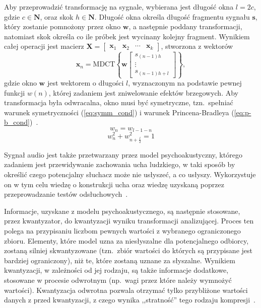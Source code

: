 \documentclass[pl,12pt]{aghdpl}
\begin{document}
Aby przeprowadzić transformację na sygnale, wybierana jest długość okna $l =
2c$, gdzie $c \in \bm N$, oraz skok $h \in \bm N$. Długość okna określa długość
fragmentu sygnału $\bm s$, który zostanie pomnożony przez okno $\bm w$, a
następnie poddany transformacji, natomiast skok określa co ile próbek jest
wycinany kolejny fragment. Wynikiem całej operacji jest macierz $\bm X =
\begin{bmatrix}\bm x_1 & \bm x_2 & \cdots  & \bm x_k\end{bmatrix}$, stworzona z
wektorów 
\begin{equation}
  \bm x_n = \text{MDCT}\left\{\bm w\begin{bmatrix}
      s_{(n-1)h}\\\vdots\\s_{(n-1)h+l}
  \end{bmatrix}\right\},
\end{equation}
gdzie okno $\bm w$ jest wektorem o długości $l$, wyznaczonym na podstawie
pewnej funkcji $w(n)$, której zadaniem jest zniwelowanie efektów brzegowych.
Aby transformacja była odwracalna, okno musi być symetryczne, tzn.\ spełniać
warunek symetryczności (\ref{eq:symm_cond}) i warunek Princena-Bradleya
(\ref{eq:p-b_cond})~\cite{PrincenBradley1986,
WangYaroslavskyVilermoVaananen2000}.
\begin{equation}\label{eq:symm_cond}
  w_n = w_{l-1-n}
\end{equation}
\begin{equation}\label{eq:p-b_cond}
  w_n^2+w_{n+\frac{l}{2}}^2 = 1
\end{equation}

Sygnał audio jest także przetwarzany przez model psychoakustyczny, którego
zadaniem jest przewidywanie zachowania ucha ludzkiego, w taki sposób by
określić czego potencjalny słuchacz może nie usłyszeć, a co usłyszy.
Wykorzystuje on w tym celu wiedzę o konstrukcji ucha oraz wiedzę uzyskaną
poprzez przeprowadzanie testów odsłuchowych~\cite{BosiGoldberg2002}.

Informacje, uzyskane z modelu psychoakustycznego, są następnie stosowane, przez
kwantyzator, do kwantyzacji wyniku transformacji analizującej. Proces ten
polega na przypisaniu liczbom pewnych wartości z wybranego ograniczonego
zbioru. Elementy, które model uzna za niesłyszalne dla potencjalnego
odbiorcy, zostaną silniej skwantyzowane (tzn.\ zbiór wartości do których są
przypisane jest bardziej ograniczony), niż te, które zostaną uznane za
słyszalne. Wynikiem kwantyzacji, w zależności od jej rodzaju, są także
informacje dodatkowe, stosowane w procesie odwrotnym (np.\ wagi przez które
należy wymnożyć wartości). Kwantyzacja odwrotna pozwala otrzymać tylko
przybliżone wartości danych z przed kwantyzacji, z czego wynika ,,stratność''
tego rodzaju kompresji~\cite{Sayood2017}.
\end{document}
